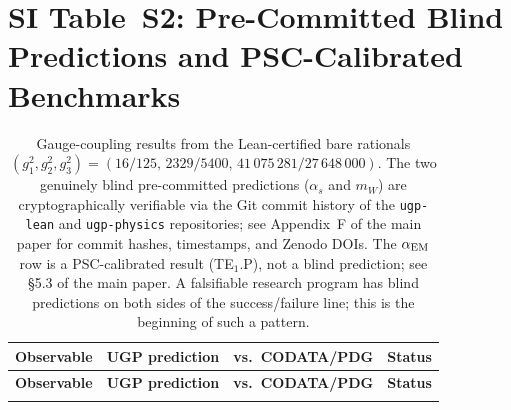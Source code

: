 \documentclass[10pt]{article}
\begin{document}
\section*{SI Table~S2: Pre-Committed Blind Predictions and PSC-Calibrated Benchmarks}

\begin{longtable}{@{} p{3.5cm} p{3.6cm} p{3.8cm} p{3.9cm} @{}}
\caption{Gauge-coupling results from the Lean-certified bare rationals $(g_1^2, g_2^2, g_3^2) = (16/125,\,2329/5400,\,41\,075\,281/27\,648\,000)$.  The two genuinely blind pre-committed predictions ($\alpha_s$ and $m_W$) are cryptographically verifiable via the Git commit history of the \texttt{ugp-lean} and \texttt{ugp-physics} repositories; see Appendix~F of the main paper for commit hashes, timestamps, and Zenodo DOIs.  The $\alpha_{\rm EM}$ row is a PSC-calibrated result (TE$_1$.P), not a blind prediction; see \S5.3 of the main paper.  A falsifiable research program has blind predictions on both sides of the success/failure line; this is the beginning of such a pattern.}
\label{tab:si_blind_predictions} \\
\toprule
\textbf{Observable} & \textbf{UGP prediction} & \textbf{vs.\ CODATA/PDG} & \textbf{Status} \\
\midrule
\endfirsthead
\toprule
\textbf{Observable} & \textbf{UGP prediction} & \textbf{vs.\ CODATA/PDG} & \textbf{Status} \\
\midrule
\endhead
\bottomrule
\endfoot


\end{longtable}
\end{document}
